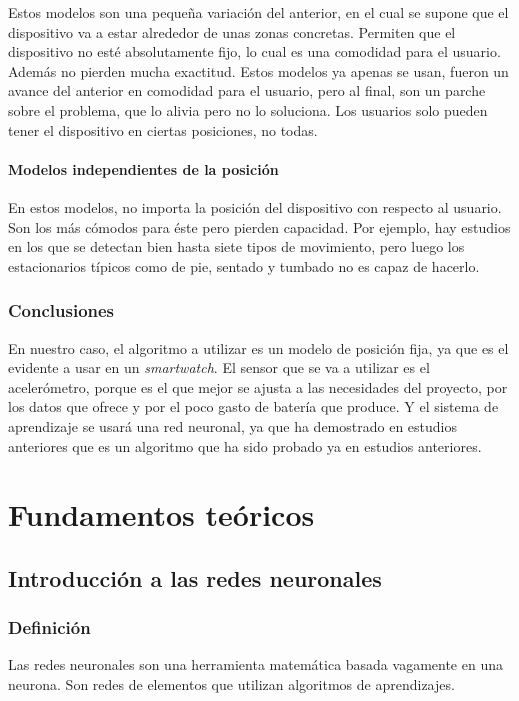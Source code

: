 \documentclass[12pt]{article}
\numberwithin{equation}{section}
\begin{document}
{Estos modelos son una pequeña variación del anterior, en el cual se supone que el dispositivo va a estar alrededor de unas zonas concretas. Permiten que el dispositivo no esté absolutamente fijo, lo cual es una comodidad para el usuario. Además no pierden mucha exactitud. Estos modelos ya apenas se usan, fueron un avance del anterior en comodidad para el usuario, pero al final, son un parche sobre el problema, que lo alivia pero no lo soluciona. Los usuarios solo pueden tener el dispositivo en ciertas posiciones, no todas.

\paragraph{Modelos independientes de la posición}

En estos modelos, no importa la posición del dispositivo con respecto al usuario. Son los más cómodos para éste pero pierden capacidad. Por ejemplo, hay estudios en los que se detectan bien hasta siete tipos de movimiento, pero luego los estacionarios típicos como de pie, sentado y tumbado no es capaz de hacerlo\cite{6488584}.%

\subsubsection{Conclusiones}

En nuestro caso, el algoritmo a utilizar es un modelo de posición fija, ya que es el evidente a usar en un \textit{smartwatch}. El sensor que se va a utilizar es el acelerómetro, porque es el que mejor se ajusta a las necesidades del proyecto, por los datos que ofrece y por el poco gasto de batería que produce. Y el sistema de aprendizaje se usará una red neuronal, ya que ha demostrado en estudios anteriores que es un algoritmo que ha sido probado ya en estudios anteriores.


\newpage
\section{Fundamentos teóricos}
\subsection{Introducción a las redes neuronales}
\subsubsection{Definición}
Las redes neuronales son una herramienta matemática basada vagamente en una neurona. Son redes de elementos que utilizan algoritmos de aprendizajes.

}
\end{document}
